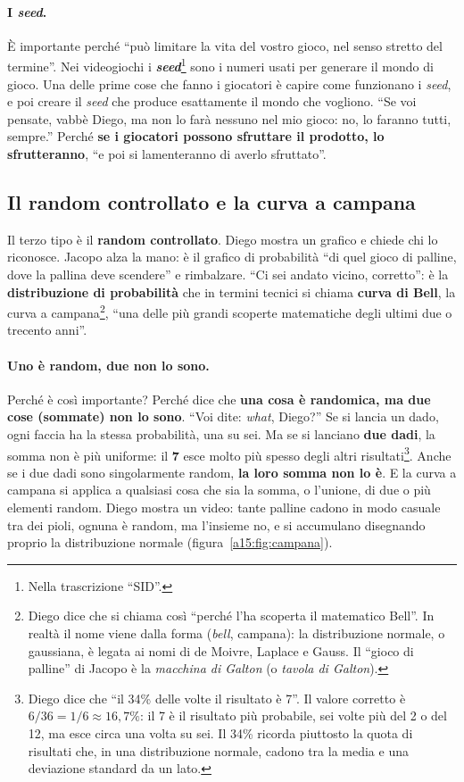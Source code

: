 \paragraph{I \emph{seed}.} È importante perché ``può limitare la vita del vostro gioco, nel
senso stretto del termine''. Nei videogiochi i \textbf{\emph{seed}}\footnote{Nella
trascrizione ``SID''.} sono i numeri usati per generare il mondo di gioco. Una delle prime
cose che fanno i giocatori è capire come funzionano i \emph{seed}, e poi creare il
\emph{seed} che produce esattamente il mondo che vogliono. ``Se voi pensate, vabbè Diego,
ma non lo farà nessuno nel mio gioco: no, lo faranno tutti, sempre.'' Perché \textbf{se i
giocatori possono sfruttare il prodotto, lo sfrutteranno}, ``e poi si lamenteranno di averlo
sfruttato''.

\subsection{Il random controllato e la curva a campana}

Il terzo tipo è il \textbf{random controllato}. Diego mostra un grafico e chiede chi lo
riconosce. Jacopo alza la mano: è il grafico di probabilità ``di quel gioco di palline, dove
la pallina deve scendere'' e rimbalzare. ``Ci sei andato vicino, corretto'': è la
\textbf{distribuzione di probabilità} che in termini tecnici si chiama \textbf{curva di
Bell}, la curva a campana\footnote{Diego dice che si chiama così ``perché l'ha scoperta il
matematico Bell''. In realtà il nome viene dalla forma (\emph{bell}, campana): la
distribuzione normale, o gaussiana, è legata ai nomi di de Moivre, Laplace e Gauss. Il
``gioco di palline'' di Jacopo è la \emph{macchina di Galton} (o \emph{tavola di Galton}).},
``una delle più grandi scoperte matematiche degli ultimi due o trecento anni''.

\paragraph{Uno è random, due non lo sono.} Perché è così importante? Perché dice che
\textbf{una cosa è randomica, ma due cose (sommate) non lo sono}. ``Voi dite: \emph{what},
Diego?'' Se si lancia un dado, ogni faccia ha la stessa probabilità, una su sei. Ma se si
lanciano \textbf{due dadi}, la somma non è più uniforme: il \textbf{7} esce molto più spesso
degli altri risultati\footnote{Diego dice che ``il 34\% delle volte il risultato è 7''. Il
valore corretto è $6/36 = 1/6 \approx 16{,}7\%$: il 7 è il risultato più probabile, sei
volte più del 2 o del 12, ma esce circa una volta su sei. Il 34\% ricorda piuttosto la
quota di risultati che, in una distribuzione normale, cadono tra la media e una deviazione
standard da un lato.}. Anche se i due dadi sono singolarmente random, \textbf{la loro somma
non lo è}. E la curva a campana si applica a qualsiasi cosa che sia la somma, o l'unione, di
due o più elementi random. Diego mostra un video: tante palline cadono in modo casuale tra
dei pioli, ognuna è random, ma l'insieme no, e si accumulano disegnando proprio la
distribuzione normale (figura~\ref{a15:fig:campana}).

